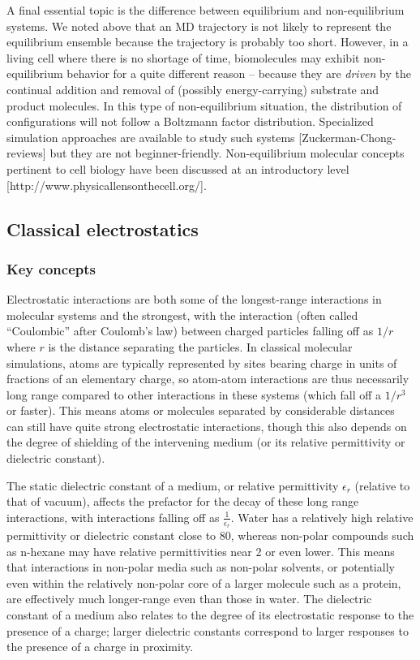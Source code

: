 \documentclass[9pt,bestpractices]{livecoms}
\begin{document}
A final essential topic is the difference between equilibrium and non-equilibrium systems.  
We noted above that an MD trajectory is not likely to represent the equilibrium ensemble because the trajectory is probably too short.  
However, in a living cell where there is no shortage of time, biomolecules may exhibit non-equilibrium behavior for a quite different reason -- because they are \emph{driven} by the continual addition and removal of (possibly energy-carrying) substrate and product molecules.  
In this type of non-equilibrium situation, the distribution of configurations will not follow a Boltzmann factor distribution.  
Specialized simulation approaches are available to study such systems [Zuckerman-Chong-reviews] but they are not beginner-friendly.  
Non-equilibrium molecular concepts pertinent to cell biology have been discussed at an introductory level [http://www.physicallensonthecell.org/].

\subsection{Classical electrostatics}
\label{sec:classical_electrostatics}
\subsubsection{Key concepts}

Electrostatic interactions are both some of the longest-range interactions in molecular systems and the strongest, with the interaction (often called
``Coulombic'' after Coulomb's law) between charged particles falling off as $1/r$ where $r$ is the distance separating the particles. 
In classical molecular simulations, atoms are typically represented by sites bearing charge in units of fractions of an elementary charge, so atom-atom interactions are thus necessarily long range compared to other interactions in these systems (which fall off a $1/r^3$ or faster).  
This means atoms or molecules separated by considerable distances can still have quite strong electrostatic interactions, though this also depends on the degree of shielding of the intervening medium (or its relative permittivity or dielectric constant).

The static dielectric constant of a medium, or relative permittivity $\epsilon_r$ (relative to that of vacuum), affects the prefactor for the decay of these long range interactions, with interactions falling off as $\frac{1}{\epsilon_r}$. 
Water has a relatively high relative permittivity or dielectric constant close to 80, whereas non-polar compounds such as n-hexane may have relative permittivities near 2 or even lower. 
This means that interactions in non-polar media such as non-polar solvents, or potentially even within the relatively non-polar core of a larger molecule such as a protein, are effectively much longer-range even than those in water. 
The dielectric constant of a medium also relates to the degree of its electrostatic response to the presence of a charge; larger dielectric constants correspond to larger responses to the presence of a charge in proximity.
\end{document}
